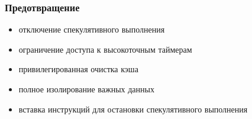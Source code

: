 






\subsubsection{Предотвращение}
\begin{frame}{\insertsubsubsection}

  \begin{itemize}
  \item отключение спекулятивного выполнения
  \item ограничение доступа к высокоточным таймерам
  \item привилегированная очистка кэша
  \item полное изолирование важных данных
  \item вставка инструкций для остановки спекулятивного выполнения
  \end{itemize}


\end{frame}